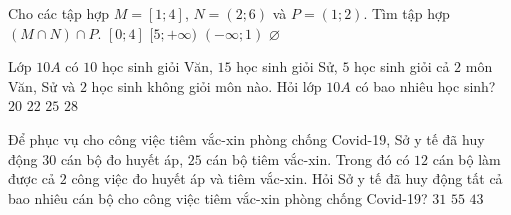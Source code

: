 \begin{ex}%
	Cho các tập hợp $M = [1; 4]$, $N = (2; 6)$ và $P = (1; 2)$. Tìm tập hợp $(M \cap N) \cap P$.
	\choice
	{$[0; 4]$}
	{$[5; + \infty  )$}
	{$(- \infty  ; 1)$}
	{\True $\varnothing $}
	\loigiai{
		Ta có $M\cap N=(2;4]\Rightarrow M\cap N\cap P=(2;4]\cap (1;2)=\varnothing$.
	}
\end{ex}
\begin{ex}%
	Lớp $10A$ có $10$ học sinh giỏi Văn, $15$ học sinh giỏi Sử, $5$ học sinh giỏi cả $2$ môn Văn, Sử và $2$ học sinh không giỏi môn nào. Hỏi lớp $10A$ có bao nhiêu học sinh?
	\choice
	{$20$ }
	{\True $22$}
	{$25$}
	{$28$}
\end{ex}
\begin{ex}%
	Để phục vụ cho công việc tiêm vắc-xin phòng chống Covid-19, Sở y tế đã huy động $30$ cán bộ đo huyết áp, $25$ cán bộ tiêm vắc-xin. Trong đó có $12$ cán bộ làm được cả $2$ công việc đo huyết áp và tiêm vắc-xin. Hỏi Sở y tế đã huy động tất cả bao nhiêu cán bộ cho công việc tiêm vắc-xin phòng chống Covid-19?
	{$31$}
	{$55$}
	{\True $43$}
\end{ex}

